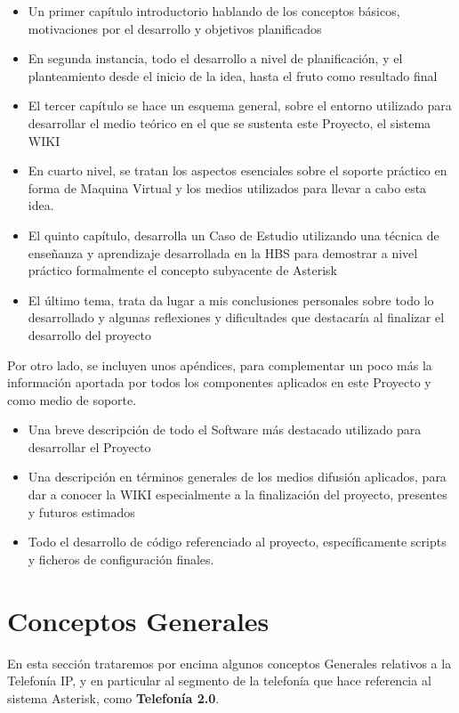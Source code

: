 \begin{itemize}
	\item Un primer capítulo introductorio hablando de los conceptos básicos, motivaciones por el desarrollo y objetivos planificados
	\item En segunda instancia, todo el desarrollo a nivel de planificación, y el planteamiento desde el inicio de la idea, hasta el fruto como resultado final
	\item El tercer capítulo se hace un esquema general, sobre el entorno utilizado para desarrollar el medio teórico en el que se sustenta este Proyecto, el sistema WIKI
	\item En cuarto nivel, se tratan los aspectos esenciales sobre el soporte práctico en forma de Maquina Virtual y los medios utilizados para llevar a cabo esta idea.
	\item El quinto capítulo, desarrolla un Caso de Estudio utilizando una técnica de enseñanza y aprendizaje desarrollada en la HBS \cite{website:hbsp} para demostrar a nivel práctico formalmente el concepto subyacente de Asterisk
	\item El último tema, trata da lugar a mis conclusiones personales sobre todo lo desarrollado y algunas reflexiones y dificultades que destacaría al finalizar el desarrollo del proyecto
\end{itemize}

Por otro lado, se incluyen unos apéndices, para complementar un poco más la información aportada por todos los componentes aplicados en este Proyecto y como medio de soporte.

\begin{itemize}
	\item Una breve descripción de todo el Software más destacado utilizado para desarrollar el Proyecto
	\item Una descripción en términos generales de los medios difusión aplicados, para dar a conocer la WIKI especialmente a la finalización del proyecto, presentes y futuros estimados
	\item Todo el desarrollo de código referenciado al proyecto, específicamente scripts y ficheros de configuración finales.
\end{itemize}

\section{Conceptos Generales}

En esta sección trataremos por encima algunos conceptos Generales relativos a la Telefonía IP, y en particular al segmento de la telefonía que hace referencia al sistema Asterisk, como \textbf{Telefonía 2.0}.

